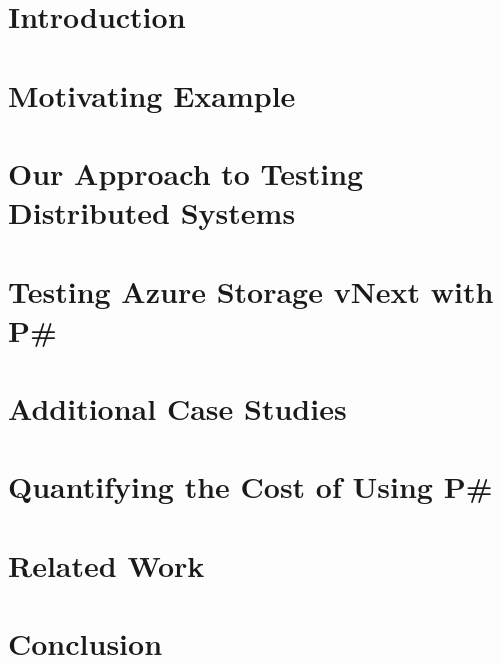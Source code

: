 \documentclass[letterpaper,twocolumn,10pt]{article}
\newcommand{\psharp}{P\#\xspace}
\begin{document}
\section{Introduction}
\label{sec:intro}



\section{Motivating Example}
\label{sec:motivation}



\section{Our Approach to Testing Distributed Systems}
\label{sec:overview}



\section{Testing Azure Storage vNext with \psharp}
\label{sec:method}



\section{Additional Case Studies}
\label{sec:cases}



\section{Quantifying the Cost of Using \psharp}
\label{sec:eval}



\section{Related Work}
\label{sec:rw}



\section{Conclusion}
\label{sec:conclusion}





{\footnotesize 
}
\end{document}
